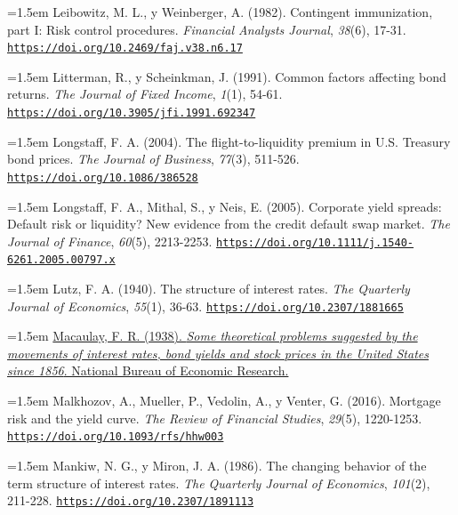 \documentclass[10pt,a4paper]{article}
\begin{document}
\noindent\hangindent=1.5em Leibowitz, M. L., y Weinberger, A. (1982). Contingent immunization, part I: Risk control procedures. \textit{Financial Analysts Journal}, \textit{38}(6), 17-31. \href{https://doi.org/10.2469/faj.v38.n6.17}{\nolinkurl{https://doi.org/10.2469/faj.v38.n6.17}}

\noindent\hangindent=1.5em Litterman, R., y Scheinkman, J. (1991). Common factors affecting bond returns. \textit{The Journal of Fixed Income}, \textit{1}(1), 54-61. \href{https://doi.org/10.3905/jfi.1991.692347}{\nolinkurl{https://doi.org/10.3905/jfi.1991.692347}}

\noindent\hangindent=1.5em Longstaff, F. A. (2004). The flight-to-liquidity premium in U.S. Treasury bond prices. \textit{The Journal of Business}, \textit{77}(3), 511-526. \href{https://doi.org/10.1086/386528}{\nolinkurl{https://doi.org/10.1086/386528}}

\noindent\hangindent=1.5em Longstaff, F. A., Mithal, S., y Neis, E. (2005). Corporate yield spreads: Default risk or liquidity? New evidence from the credit default swap market. \textit{The Journal of Finance}, \textit{60}(5), 2213-2253. \href{https://doi.org/10.1111/j.1540-6261.2005.00797.x}{\nolinkurl{https://doi.org/10.1111/j.1540-6261.2005.00797.x}}

\noindent\hangindent=1.5em Lutz, F. A. (1940). The structure of interest rates. \textit{The Quarterly Journal of Economics}, \textit{55}(1), 36-63. \href{https://doi.org/10.2307/1881665}{\nolinkurl{https://doi.org/10.2307/1881665}}

\noindent\hangindent=1.5em \href{https://www.nber.org/books/maca38-1}{Macaulay, F. R. (1938). \textit{Some theoretical problems suggested by the movements of interest rates, bond yields and stock prices in the United States since 1856}. National Bureau of Economic Research.}

\noindent\hangindent=1.5em Malkhozov, A., Mueller, P., Vedolin, A., y Venter, G. (2016). Mortgage risk and the yield curve. \textit{The Review of Financial Studies}, \textit{29}(5), 1220-1253. \href{https://doi.org/10.1093/rfs/hhw003}{\nolinkurl{https://doi.org/10.1093/rfs/hhw003}}

\noindent\hangindent=1.5em Mankiw, N. G., y Miron, J. A. (1986). The changing behavior of the term structure of interest rates. \textit{The Quarterly Journal of Economics}, \textit{101}(2), 211-228. \href{https://doi.org/10.2307/1891113}{\nolinkurl{https://doi.org/10.2307/1891113}}
\end{document}

